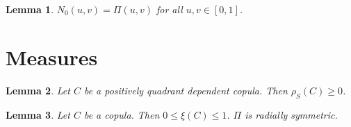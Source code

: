\documentclass{article}
\newtheorem{lemma}{Lemma}
\begin{document}
\begin{lemma}\label{gauss}
$N_0(u,v)=\Pi(u,v)$ for all $u,v\in[0,1]$.
\end{lemma}

\section{Measures}

\begin{lemma}\label{pqd}
Let $C$ be a positively quadrant dependent copula. Then $\rho_S(C)\ge0$.
\end{lemma}

\begin{lemma}\label{xi}
Let $C$ be a copula. Then $0\le\xi(C)\le1$. $\Pi$ is radially symmetric.
\end{lemma}
\end{document}
